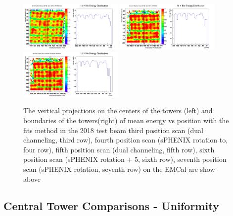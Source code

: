 \documentclass[hidelinks,11pt]{article}
\numberwithin{figure}{section}
\numberwithin{table}{section}
\begin{document}
\begin{figure}[hbtp]
\begin{center}
\includegraphics[width=0.45\textwidth]{Plots/2018/6th/CombX7.png}
\includegraphics[width=0.45\textwidth]{Plots/2018/7th/CombX6.png}
\includegraphics[width=0.45\textwidth]{Plots/2018/7th/CombX7.png}
\caption{The vertical projections on the centers of the towers (left) and boundaries of the towers(right) of mean energy vs position with the fits method in the 2018 test beam third position scan (dual channeling, third row), fourth position scan (sPHENIX rotation to, four row), fifth position scan (dual channeling, fifth row), sixth position scan (sPHENIX rotation + 5, sixth row),  seventh position scan (sPHENIX rotation, seventh row) on the EMCal are show above}
\label{fig:1DProjCenV2018}
\end{center}
\end{figure} 


\subsection{Central Tower Comparisons - Uniformity}
\end{document}
